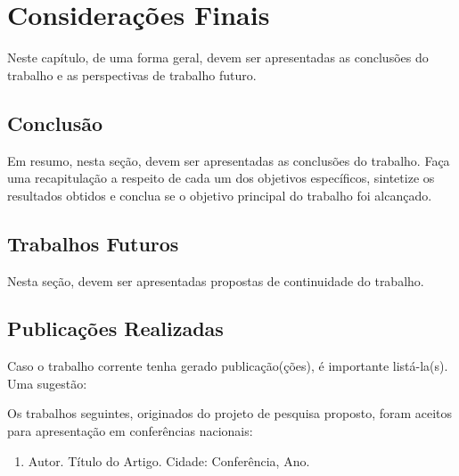 \chapter{Considerações Finais} \label{consideracoes}

Neste capítulo, de uma forma geral, devem ser apresentadas as conclusões do trabalho e as perspectivas de trabalho futuro.

\section{Conclusão}\label{conclusao}

Em resumo, nesta seção, devem ser apresentadas as conclusões do trabalho. Faça uma recapitulação a respeito de cada um dos objetivos específicos, sintetize os resultados obtidos e conclua se o objetivo principal do trabalho foi alcançado.

\section{Trabalhos Futuros}\label{trabalhosFuturos}

Nesta seção, devem ser apresentadas propostas de continuidade do trabalho.

\section{Publicações Realizadas}\label{publicacoes}

Caso o trabalho corrente tenha gerado publicação(ções), é importante listá-la(s). Uma sugestão:

Os trabalhos seguintes, originados do projeto de pesquisa proposto, foram aceitos para apresentação em conferências nacionais:

\begin{enumerate}
   \item Autor. Título do Artigo. Cidade: Conferência, Ano.
 \end{enumerate}
